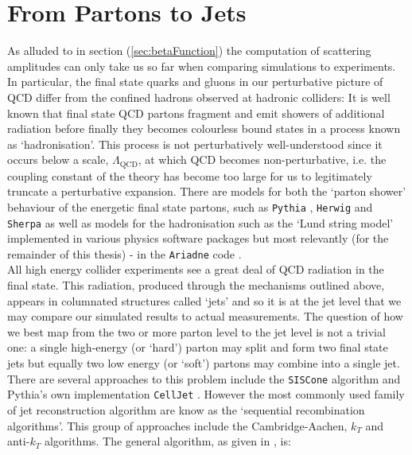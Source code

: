 \section{From Partons to Jets}

	As alluded to in section (\ref{sec:betaFunction}) the computation of scattering amplitudes can only take us so far
	when comparing simulations to experiments.  In particular, the final state quarks and gluons in our perturbative
	picture of QCD differ from the confined hadrons observed at hadronic colliders:  It is well known that final state
	QCD partons fragment and emit showers of additional radiation before finally they becomes colourless bound states
	in a process known as `hadronisation'.  This process is not perturbatively well-understood since it occurs below a scale,
	$\Lambda_{\text{QCD}}$, at which QCD becomes non-perturbative, i.e. the coupling constant of the
	theory has become too large for us to legitimately truncate a perturbative expansion.  There are models for both
	the `parton shower' behaviour of the energetic final state partons, such as \texttt{Pythia} \cite{Sjostrand:2007gs},
	\texttt{Herwig} \cite{Corcella:2000bw} and \texttt{Sherpa} \cite{Hoche:2014kca} as well as models for the hadronisation
	such as the `Lund string model' \cite{Andersson:2002ap} implemented in various physics software packages but most
	relevantly (for the remainder of this thesis) - in the \texttt{Ariadne} code \cite{Lonnblad:1992tz,Andersen:2011zd}.\\
	All high energy collider experiments
	see a great deal of QCD radiation in the final state.  This radiation, produced through the mechanisms outlined above,
	appears in columnated structures called `jets' and so it is at the jet level that we may compare our simulated results
	to actual measurements. The question of how we best map from the two or more parton level to the jet level is not a trivial
	one:  a single high-energy (or `hard') parton may split and form two final state jets but equally two low energy (or
	`soft') partons may combine into a single jet.\\There are several approaches to this problem include the \texttt{SISCone}
	algorithm \cite{Salam:2007xv} and Pythia's own implementation \texttt{CellJet} \cite{Sjostrand:2000wi}. However the
	most commonly used family of jet reconstruction algorithm are know as the `sequential recombination algorithms'.
	This group of approaches include the Cambridge-Aachen, $k_T$ and anti-$k_T$ algorithms. The general algorithm, as
	given in \cite{Cacciari:2008gp}, is:

